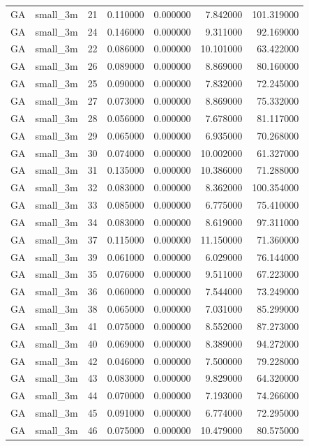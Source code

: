 \begin{tabular}{llrrrrr}
GA & small_3m & 21 & 0.110000 & 0.000000 & 7.842000 & 101.319000 \\
GA & small_3m & 24 & 0.146000 & 0.000000 & 9.311000 & 92.169000 \\
GA & small_3m & 22 & 0.086000 & 0.000000 & 10.101000 & 63.422000 \\
GA & small_3m & 26 & 0.089000 & 0.000000 & 8.869000 & 80.160000 \\
GA & small_3m & 25 & 0.090000 & 0.000000 & 7.832000 & 72.245000 \\
GA & small_3m & 27 & 0.073000 & 0.000000 & 8.869000 & 75.332000 \\
GA & small_3m & 28 & 0.056000 & 0.000000 & 7.678000 & 81.117000 \\
GA & small_3m & 29 & 0.065000 & 0.000000 & 6.935000 & 70.268000 \\
GA & small_3m & 30 & 0.074000 & 0.000000 & 10.002000 & 61.327000 \\
GA & small_3m & 31 & 0.135000 & 0.000000 & 10.386000 & 71.288000 \\
GA & small_3m & 32 & 0.083000 & 0.000000 & 8.362000 & 100.354000 \\
GA & small_3m & 33 & 0.085000 & 0.000000 & 6.775000 & 75.410000 \\
GA & small_3m & 34 & 0.083000 & 0.000000 & 8.619000 & 97.311000 \\
GA & small_3m & 37 & 0.115000 & 0.000000 & 11.150000 & 71.360000 \\
GA & small_3m & 39 & 0.061000 & 0.000000 & 6.029000 & 76.144000 \\
GA & small_3m & 35 & 0.076000 & 0.000000 & 9.511000 & 67.223000 \\
GA & small_3m & 36 & 0.060000 & 0.000000 & 7.544000 & 73.249000 \\
GA & small_3m & 38 & 0.065000 & 0.000000 & 7.031000 & 85.299000 \\
GA & small_3m & 41 & 0.075000 & 0.000000 & 8.552000 & 87.273000 \\
GA & small_3m & 40 & 0.069000 & 0.000000 & 8.389000 & 94.272000 \\
GA & small_3m & 42 & 0.046000 & 0.000000 & 7.500000 & 79.228000 \\
GA & small_3m & 43 & 0.083000 & 0.000000 & 9.829000 & 64.320000 \\
GA & small_3m & 44 & 0.070000 & 0.000000 & 7.193000 & 74.266000 \\
GA & small_3m & 45 & 0.091000 & 0.000000 & 6.774000 & 72.295000 \\
GA & small_3m & 46 & 0.075000 & 0.000000 & 10.479000 & 80.575000 \\

\end{tabular}
